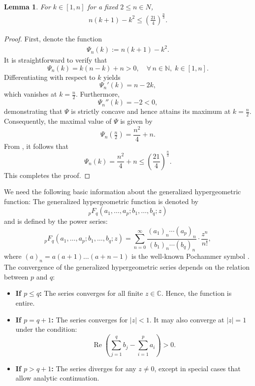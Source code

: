\documentclass[a4paper,11pt,reqno]{amsart}
\newtheorem{lemma}{Lemma}
\DeclareMathOperator{\real}{Re}
\begin{document}
\begin{lemma}\label{lemma-basic2}
    For $k \in [1,n]$ for a fixed $2 \le n \in N$, 
    \begin{align}
     n(k+1) -k^2 \le \left(\frac{21}{4}\right)^{\frac{n}{3}}.
    \end{align}
\end{lemma}
\begin{proof}
    First, denote the function
    \begin{align}
        \Psi_n(k):= n(k+1) - k^2.
    \end{align}
    It is straightforward to verify that 
\[
\Psi_n(k) = k(n-k) + n > 0, \quad \forall\, n \in \mathbb{N}, \; k \in [1,n].
\]
Differentiating with respect to $k$ yields
\[
\Psi_n'(k) = n - 2k,
\]
which vanishes at $k = \tfrac{n}{2}$. Furthermore,
\[
\Psi_n''(k) = -2 < 0,
\]
demonstrating that $\Psi$ is strictly concave and hence attains its maximum at $k = \tfrac{n}{2}$. Consequently, the maximal value of $\Psi$ is given by
\begin{equation}
    \Psi_n\!\left(\tfrac{n}{2}\right) = \frac{n^{2}}{4} + n. 
\end{equation}
From , it follows that 
\[\Psi_n\!(k) = \frac{n^{2}}{4} + n \leq \left(\frac{21}{4}\right)^{\frac{n}{3}}. \]
This completes the proof. \end{proof}

We need the following basic information about the generalized hypergeometric function: The {generalized hypergeometric function} is denoted by
\[
{}_pF_q(a_1, \ldots, a_p; b_1, \ldots, b_q; z)
\]
and is defined by the power series:
\[
{}_pF_q(a_1, \ldots, a_p; b_1, \ldots, b_q; z) = \sum_{n=0}^{\infty} \frac{(a_1)_n \cdots (a_p)_n}{(b_1)_n \cdots (b_q)_n} \cdot \frac{z^n}{n!},
\]
where $(a)_n=a(a+1)\ldots (a+n-1)$ is the well-known Pochammer symbol \cite{Rainville1971}. The convergence of the generalized hypergeometric series depends on the relation between $p$ and $q$:

\begin{itemize}
    \item \textbf{If $p \leq q$:} The series converges for all finite $z \in \mathbb{C}$. Hence, the function is entire.
    
    \item \textbf{If $p = q + 1$:} The series converges for $|z| < 1$. It may also converge at $|z| = 1$ under the condition:
    \[
    \real\left(\sum_{j=1}^q b_j - \sum_{i=1}^p a_i\right) > 0.
    \]
    
    \item \textbf{If $p > q + 1$:} The series diverges for any $z \neq 0$, except in special cases that allow analytic continuation.
\end{itemize}
\end{document}
